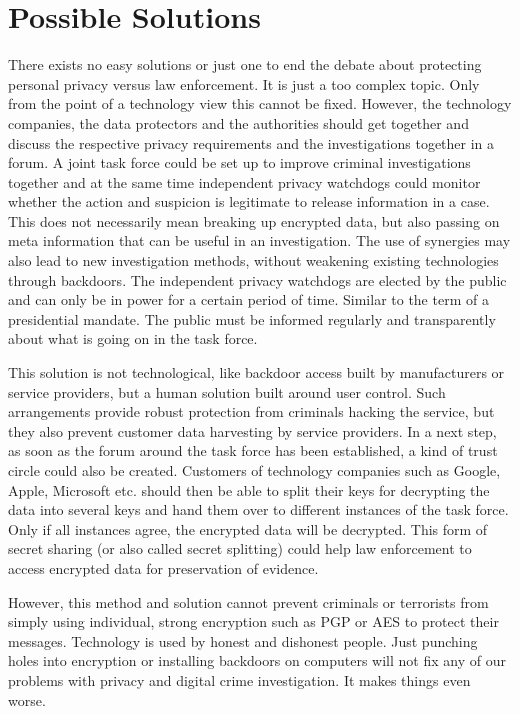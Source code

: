 \documentclass[a4paper, 11pt]{article}
\begin{document}
\section*{Possible Solutions}
There exists no easy solutions or just one to end the debate about protecting personal privacy versus law enforcement. It is just a too complex topic. Only from the point of a technology view this cannot be fixed. However, the technology companies, the data protectors and the authorities should get together and discuss the respective privacy requirements and the investigations together in a forum. A joint task force could be set up to improve criminal investigations together and at the same time independent privacy watchdogs could monitor whether the action and suspicion is legitimate to release information in a case. This does not necessarily mean breaking up encrypted data, but also passing on meta information that can be useful in an investigation.
The use of synergies may also lead to new investigation methods, without weakening existing technologies through backdoors. The independent privacy watchdogs are elected by the public and can only be in power for a certain period of time. Similar to the term of a presidential mandate. The public must be informed regularly and transparently about what is going on in the task force.
\par This solution is not technological, like backdoor access built by manufacturers or service providers, but a human solution built around user control. Such arrangements provide robust protection from criminals hacking the service, but they also prevent customer data harvesting by service providers. In a next step, as soon as the forum around the task force has been established, a kind of trust circle could also be created. Customers of technology companies such as Google, Apple, Microsoft etc. should then be able to split their keys for decrypting the data into several keys and hand them over to different instances of the task force. Only if all instances agree, the encrypted data will be decrypted. This form of secret sharing (or also called secret splitting) could help law enforcement to access encrypted data for preservation of evidence.
\par However, this method and solution cannot prevent criminals or terrorists from simply using individual, strong encryption such as PGP or AES to protect their messages. Technology is used by honest and dishonest people. Just punching holes into encryption or installing backdoors on computers will not fix any of our problems with privacy and digital crime investigation. It makes things even worse.
\end{document}
